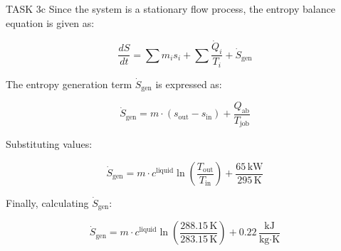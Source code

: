 TASK 3c  
Since the system is a stationary flow process, the entropy balance equation is given as:  

\[
\frac{dS}{dt} = \sum m_i s_i + \sum \frac{\dot{Q}_i}{T_i} + \dot{S}_{\text{gen}}
\]

The entropy generation term \( \dot{S}_{\text{gen}} \) is expressed as:  

\[
\dot{S}_{\text{gen}} = m \cdot (s_{\text{out}} - s_{\text{in}}) + \frac{Q_{\text{ab}}}{T_{\text{job}}}
\]

Substituting values:  

\[
\dot{S}_{\text{gen}} = m \cdot c^{\text{liquid}} \ln \left( \frac{T_{\text{out}}}{T_{\text{in}}} \right) + \frac{65 \, \text{kW}}{295 \, \text{K}}
\]

Finally, calculating \( \dot{S}_{\text{gen}} \):  

\[
\dot{S}_{\text{gen}} = m \cdot c^{\text{liquid}} \ln \left( \frac{288.15 \, \text{K}}{283.15 \, \text{K}} \right) + 0.22 \, \frac{\text{kJ}}{\text{kg·K}}
\]